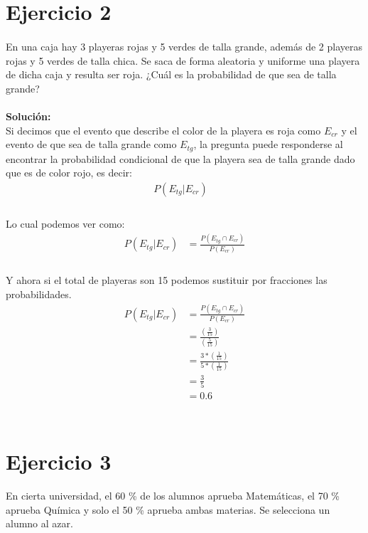 \documentclass[12pt]{article}
\begin{document}
\section{Ejercicio 2}
\paragraph{} En una caja hay 3 playeras rojas y 5 verdes de talla grande, además de 2 playeras rojas y 5
verdes de talla chica. Se saca de forma aleatoria y uniforme una playera de dicha caja y resulta
ser roja. ¿Cuál es la probabilidad de que sea de talla grande?
\paragraph{}\textbf{Solución:}\\
Si decimos que el evento que describe el color de la playera es roja como $E_{cr}$ y el evento de que sea de talla grande como $E_{tg}$, la pregunta puede responderse al encontrar la probabilidad condicional de que la playera sea de talla grande dado que es de color rojo, es decir:
\begin{equation}\label{e2_1}
\begin{split}
P(E_{tg}|E_{cr}) &\\
\end{split}
\end{equation}\\
Lo cual podemos ver como:
\begin{equation}\label{e2_2}
\begin{split}
P(E_{tg}|E_{cr}) &= \frac{P(E_{tg}\cap E_{cr})}{P(E_{cr})}\\
\end{split}
\end{equation}\\
Y ahora si el total de playeras son 15 podemos sustituir por fracciones las probabilidades.
\begin{equation}\label{e2_3}
\begin{split}
P(E_{tg}|E_{cr}) &= \frac{P(E_{tg}\cap E_{cr})}{P(E_{cr})}\\
&= \frac{(\frac{3}{15})}{(\frac{5}{15})}\\
&= \frac{3*(\frac{1}{15})}{5*(\frac{1}{15})}\\
&= \frac{3}{5}\\
&= 0.6\\
\end{split}
\end{equation}\\
\section{Ejercicio 3}
En cierta universidad, el 60 \% de los alumnos aprueba Matemáticas, el 70 \% aprueba Química
y solo el 50 \% aprueba ambas materias. Se selecciona un alumno al azar.
\end{document}
